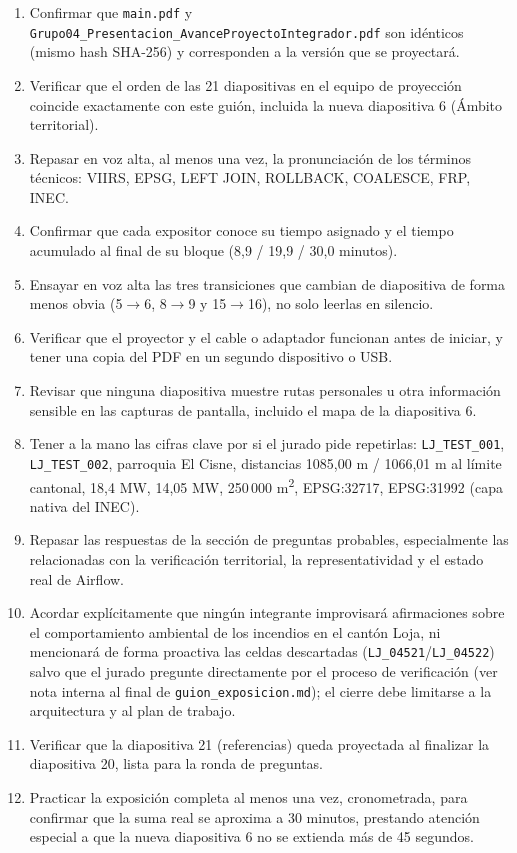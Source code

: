 \documentclass[11pt,a4paper]{article}
\begin{document}
\begin{enumerate}[itemsep=6pt]
  \item {\raggedright Confirmar que \texttt{main.pdf} y
    \texttt{Grupo04\_Presentacion\_AvanceProyectoIntegrador.pdf} son
    id\'enticos (mismo hash SHA-256) y corresponden a la versi\'on que
    se proyectar\'a.\par}
  \item Verificar que el orden de las 21 diapositivas en el equipo de
    proyecci\'on coincide exactamente con este gui\'on, incluida la
    nueva diapositiva 6 (\'Ambito territorial).
  \item Repasar en voz alta, al menos una vez, la pronunciaci\'on de los
    t\'erminos t\'ecnicos: VIIRS, EPSG, LEFT JOIN, ROLLBACK, COALESCE,
    FRP, INEC.
  \item Confirmar que cada expositor conoce su tiempo asignado y el
    tiempo acumulado al final de su bloque (8,9 / 19,9 / 30,0 minutos).
  \item Ensayar en voz alta las tres transiciones que cambian de
    diapositiva de forma menos obvia (5$\to$6, 8$\to$9 y 15$\to$16), no
    solo leerlas en silencio.
  \item Verificar que el proyector y el cable o adaptador funcionan
    antes de iniciar, y tener una copia del PDF en un segundo
    dispositivo o USB.
  \item Revisar que ninguna diapositiva muestre rutas personales u otra
    informaci\'on sensible en las capturas de pantalla, incluido el
    mapa de la diapositiva 6.
  \item Tener a la mano las cifras clave por si el jurado pide
    repetirlas: \texttt{LJ\_TEST\_001}, \texttt{LJ\_TEST\_002}, parroquia
    El Cisne, distancias 1085,00 m / 1066,01 m al l\'imite cantonal,
    18,4 MW, 14,05 MW, 250\,000 m\textsuperscript{2}, EPSG:32717,
    EPSG:31992 (capa nativa del INEC).
  \item Repasar las respuestas de la secci\'on de preguntas probables,
    especialmente las relacionadas con la verificaci\'on territorial,
    la representatividad y el estado real de Airflow.
  \item Acordar expl\'icitamente que ning\'un integrante improvisar\'a
    afirmaciones sobre el comportamiento ambiental de los incendios en
    el cant\'on Loja, ni mencionar\'a de forma proactiva las celdas
    descartadas (\texttt{LJ\_04521}/\texttt{LJ\_04522}) salvo que el
    jurado pregunte directamente por el proceso de verificaci\'on (ver
    nota interna al final de \texttt{guion\_exposicion.md}); el cierre
    debe limitarse a la arquitectura y al plan de trabajo.
  \item Verificar que la diapositiva 21 (referencias) queda proyectada
    al finalizar la diapositiva 20, lista para la ronda de preguntas.
  \item Practicar la exposici\'on completa al menos una vez,
    cronometrada, para confirmar que la suma real se aproxima a 30
    minutos, prestando atenci\'on especial a que la nueva diapositiva 6
    no se extienda m\'as de 45 segundos.
\end{enumerate}
\end{document}
